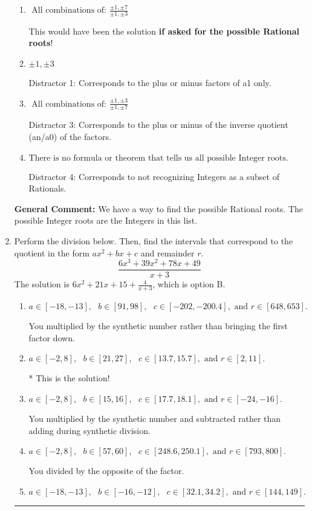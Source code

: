 \documentclass{extbook}[14pt]
\newcommand{\litem}[1]{\item #1

\rule{\textwidth}{0.4pt}}
\begin{document}
\begin{enumerate}
{\begin{enumerate}[label=\Alph*.]
* This is the solution \textbf{since we asked for the possible Integer roots}!
\item \( \text{ All combinations of: }\frac{\pm 1,\pm 7}{\pm 1,\pm 3} \)

This would have been the solution \textbf{if asked for the possible Rational roots}!
\item \( \pm 1,\pm 3 \)

 Distractor 1: Corresponds to the plus or minus factors of a1 only.
\item \( \text{ All combinations of: }\frac{\pm 1,\pm 3}{\pm 1,\pm 7} \)

 Distractor 3: Corresponds to the plus or minus of the inverse quotient (an/a0) of the factors. 
\item \( \text{There is no formula or theorem that tells us all possible Integer roots.} \)

 Distractor 4: Corresponds to not recognizing Integers as a subset of Rationals.
\end{enumerate}

\textbf{General Comment:} We have a way to find the possible Rational roots. The possible Integer roots are the Integers in this list.
}
\litem{
Perform the division below. Then, find the intervals that correspond to the quotient in the form $ax^2+bx+c$ and remainder $r$.
\[ \frac{6x^{3} +39 x^{2} +78 x + 49}{x + 3} \]The solution is \( 6x^{2} +21 x + 15 + \frac{4}{x + 3} \), which is option B.\begin{enumerate}[label=\Alph*.]
\item \( a \in [-18, -13], \text{   } b \in [91, 98], \text{   } c \in [-202, -200.4], \text{   and   } r \in [648, 653]. \)

 You multiplied by the synthetic number rather than bringing the first factor down.
\item \( a \in [-2, 8], \text{   } b \in [21, 27], \text{   } c \in [13.7, 15.7], \text{   and   } r \in [2, 11]. \)

* This is the solution!
\item \( a \in [-2, 8], \text{   } b \in [15, 16], \text{   } c \in [17.7, 18.1], \text{   and   } r \in [-24, -16]. \)

 You multiplied by the synthetic number and subtracted rather than adding during synthetic division.
\item \( a \in [-2, 8], \text{   } b \in [57, 60], \text{   } c \in [248.6, 250.1], \text{   and   } r \in [793, 800]. \)

 You divided by the opposite of the factor.
\item \( a \in [-18, -13], \text{   } b \in [-16, -12], \text{   } c \in [32.1, 34.2], \text{   and   } r \in [144, 149]. \)


\end{enumerate}}
\end{enumerate}
\end{document}
